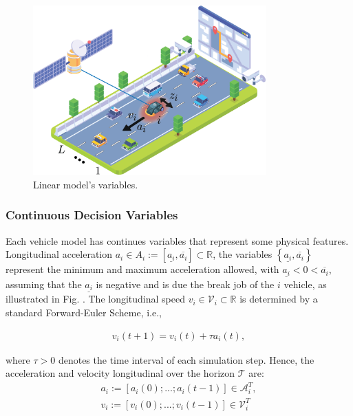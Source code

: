 \begin{figure}[H]
    \centering
    \includegraphics[width=0.8\textwidth]{Kap3/linear_model.png}
    \caption{Linear model's variables.}
    \label{fig:variables}
\end{figure}


\subsubsection{Continuous Decision Variables}
\label{continous_decision_variables}

Each vehicle model has continues variables that represent some physical features. Longitudinal acceleration $a_i \in A_i := \left [ \underline{a_i}, \overline{a_i} \right ] \subset \mathbb{R}$, the variables $\left \{ \underline{a_i}, \overline{a_i} \right \}
$ represent the minimum and maximum acceleration allowed, with $\underline{a_i}< 0 <  \overline{a_i} $, assuming that the $\underline{a_i}$ is negative and is due the break job of the $i$ vehicle, as illustrated in Fig. \label{fig:variables}. The longitudinal speed $v_i \in \mathcal{V}_i \subset \mathbb{R}$ is determined by a standard Forward-Euler Scheme, i.e.,

\begin{gather}
v_i(t+1) = v_i(t) + \tau a_i(t),
\end{gather}

where $\tau > 0$ denotes the time interval of each simulation step. Hence, the acceleration and velocity longitudinal over the horizon $\mathcal{T}$ are: 
\begin{gather*}
a_i := \left [ a_i(0); ...; a_i(t-1) \right ] \in \mathcal{A}^T_i, \\
v_i := \left [ v_i(0); ...; v_i(t-1) \right ] \in \mathcal{V}^T_i
\end{gather*}




